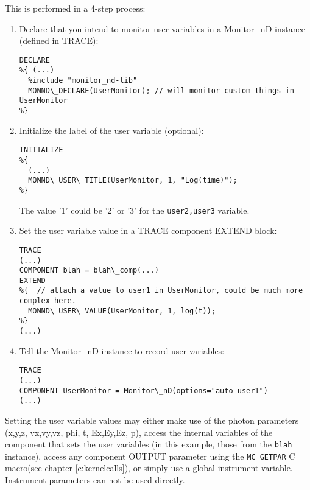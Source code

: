 This is performed in a 4-step process:
\begin{enumerate}
\item Declare that you intend to monitor user variables in a Monitor\_nD instance (defined in TRACE):
\begin{lstlisting}
DECLARE
%{ (...)
  %include "monitor_nd-lib"
  MONND\_DECLARE(UserMonitor); // will monitor custom things in UserMonitor
%}
\end{lstlisting}
\item Initialize the label of the user variable (optional):
\begin{lstlisting}
INITIALIZE
%{
  (...)
  MONND\_USER\_TITLE(UserMonitor, 1, "Log(time)");
%}
\end{lstlisting}
The value '1' could be '2' or '3' for the \verb+user2,user3+ variable.
\item Set the user variable value in a TRACE component EXTEND block:
\begin{lstlisting}
TRACE
(...)
COMPONENT blah = blah\_comp(...)
EXTEND
%{  // attach a value to user1 in UserMonitor, could be much more complex here.
  MONND\_USER\_VALUE(UserMonitor, 1, log(t));
%}
(...)
\end{lstlisting}
\item Tell the Monitor\_nD instance to record user variables:
\begin{lstlisting}
TRACE
(...)
COMPONENT UserMonitor = Monitor\_nD(options="auto user1")
(...)
\end{lstlisting}
\end{enumerate}
Setting the user variable values may either make use of the photon parameters
(x,y,z, vx,vy,vz, phi, t, Ex,Ey,Ez, p), access the internal variables of the
component that sets the user variables (in this example, those from the
\verb+blah+ instance), access any component OUTPUT parameter
 using the \verb+MC_GETPAR+ C macro(see
chapter \ref{c:kernelcalls}), or simply use a global instrument variable.
Instrument parameters can not be used directly.

